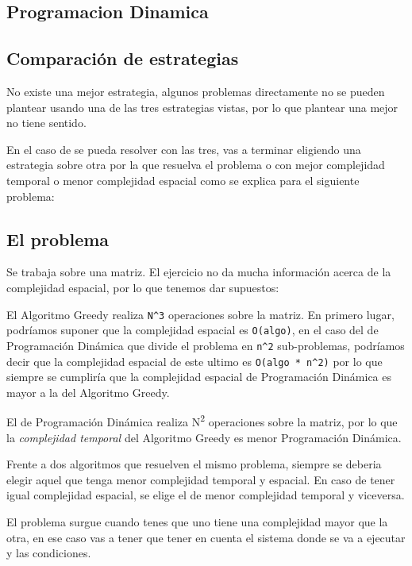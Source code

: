 \documentclass[titlepage,a4paper]{article}
\begin{document}
\subsection{Programacion Dinamica}
\label{sec:orgb1de8fb}

\subsection{Comparación de estrategias}
\label{sec:org939c4a7}

No existe una mejor estrategia, algunos problemas directamente no se pueden
plantear usando una de las tres estrategias vistas, por lo que plantear una
mejor no tiene sentido.

En el caso de se pueda resolver con las tres, vas a terminar eligiendo una
estrategia sobre otra por la que resuelva el problema o con mejor complejidad
temporal o menor complejidad espacial como se explica para el siguiente problema:

\subsection{El problema}
\label{sec:org06d69ec}

Se trabaja sobre una matriz. El ejercicio no da mucha información acerca de la
complejidad espacial, por lo que tenemos dar supuestos:

El Algoritmo Greedy realiza \texttt{N\textasciicircum{}3} operaciones sobre la matriz. En primero lugar,
podríamos suponer que la complejidad espacial es \texttt{O(algo)}, en el caso del de
Programación Dinámica que divide el problema en \texttt{n\textasciicircum{}2} sub-problemas, podríamos
decir que la complejidad espacial de este ultimo es \texttt{O(algo * n\textasciicircum{}2)} por lo que
siempre se cumpliría que la complejidad espacial de Programación Dinámica es
mayor a la del Algoritmo Greedy.

El de Programación Dinámica realiza N\textsuperscript{2} operaciones sobre la matriz, por lo que
la \emph{complejidad temporal} del Algoritmo Greedy es menor Programación Dinámica.

Frente a dos algoritmos que resuelven el mismo problema, siempre se deberia
elegir aquel que tenga menor complejidad temporal y espacial. En caso de tener
igual complejidad espacial, se elige el de menor complejidad temporal y
viceversa.

El problema surgue cuando tenes que uno tiene una complejidad mayor que la otra,
en ese caso vas a tener que tener en cuenta el sistema donde se va a ejecutar y
las condiciones.
\end{document}

